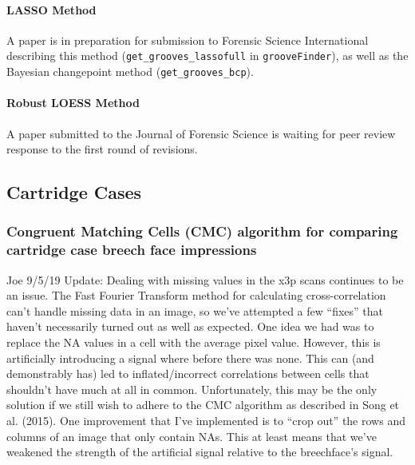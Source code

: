 \documentclass[]{book}
\let\oldparagraph\paragraph
\renewcommand{\paragraph}[1]{\oldparagraph{#1}\mbox{}}
\begin{document}
\hypertarget{lasso-method}{%
\paragraph{LASSO Method}\label{lasso-method}}

A paper is in preparation for submission to Forensic Science International describing this method (\texttt{get\_grooves\_lassofull} in \texttt{grooveFinder}), as well as the Bayesian changepoint method (\texttt{get\_grooves\_bcp}).

\hypertarget{robust-loess-method}{%
\paragraph{Robust LOESS Method}\label{robust-loess-method}}

A paper submitted to the Journal of Forensic Science is waiting for peer review response to the first round of revisions.

\hypertarget{cartridge-cases}{%
\subsection{Cartridge Cases}\label{cartridge-cases}}

\hypertarget{congruent-matching-cells-cmc-algorithm-for-comparing-cartridge-case-breech-face-impressions}{%
\subsubsection{Congruent Matching Cells (CMC) algorithm for comparing cartridge case breech face impressions}\label{congruent-matching-cells-cmc-algorithm-for-comparing-cartridge-case-breech-face-impressions}}

Joe 9/5/19 Update: Dealing with missing values in the x3p scans continues to be an issue. The Fast Fourier Transform method for calculating cross-correlation can't handle missing data in an image, so we've attempted a few ``fixes'' that haven't necessarily turned out as well as expected. One idea we had was to replace the NA values in a cell with the average pixel value. However, this is artificially introducing a signal where before there was none. This can (and demonstrably has) led to inflated/incorrect correlations between cells that shouldn't have much at all in common. Unfortunately, this may be the only solution if we still wish to adhere to the CMC algorithm as described in Song et al. (2015). One improvement that I've implemented is to ``crop out'' the rows and columns of an image that only contain NAs. This at least means that we've weakened the strength of the artificial signal relative to the breechface's signal.
\end{document}
